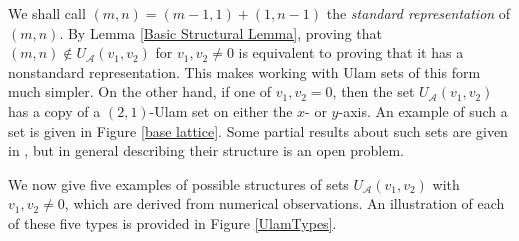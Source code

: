 \documentclass{amsart}
\newcommand{\A}{\mathcal{A}}
\theoremstyle{theorem}
\theoremstyle{definition}
\begin{document}
We shall call $(m, n) = (m - 1, 1) + (1,n - 1)$ the \emph{standard representation} of $(m,n)$. By Lemma \ref{Basic Structural Lemma}, proving that $(m,n) \notin U_\A(v_1, v_2)$ for $v_1, v_2 \neq 0$ is equivalent to proving that it has a nonstandard representation. This makes working with Ulam sets of this form much simpler. On the other hand, if one of $v_1, v_2 = 0$, then the set $U_\A(v_1, v_2)$ has a copy of a $(2,1)$-Ulam set on either the $x$- or $y$-axis. An example of such a set is given in Figure \ref{base lattice}. Some partial results about such sets are given in \cite{kravitz_steinerberger_2017}, but in general describing their structure is an open problem.

We now give five examples of possible structures of sets $U_\A(v_1, v_2)$ with $v_1, v_2 \neq 0$, which are derived from numerical observations. An illustration of each of these five types is provided in Figure \ref{UlamTypes}.
\end{document}

